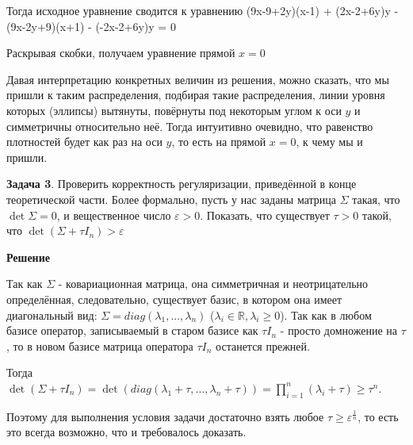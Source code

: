 Тогда исходное уравнение сводится к уравнению \left(9x-9+2y\right)\left(x-1\right) + \left(2x-2+6y\right)y - \left(9x-2y+9\right)\left(x+1\right) - \left(-2x-2+6y\right)y = 0

Раскрывая скобки, получаем уравнение прямой $x = 0$

Давая интерпретацию конкретных величин из решения, можно сказать, что мы пришли к таким распределения, подбирая такие распределения, линии уровня которых (эллипсы) вытянуты, повёрнуты под некоторым углом к оси $y$ и симметричны относительно неё. Тогда интуитивно очевидно, что равенство плотностей будет как раз на оси $y$,  то есть на прямой $x = 0$, к чему мы и пришли.



\textbf{Задача 3}. Проверить корректность регуляризации, приведённой в конце теоретической части. Более формально, пусть у нас заданы матрица $\Sigma$ такая, что $\det \Sigma = 0$, и вещественное число $\varepsilon > 0$. Показать, что существует $\tau > 0$ такой, что $\det(\Sigma + \tau I_{n}) > \varepsilon$

\textbf{Решение}

 Так как $\Sigma$ - ковариационная матрица, она симметричная и неотрицательно определённая, следовательно, существует базис, в котором она имеет диагональный вид: $\Sigma = diag (\lambda_1, ..., \lambda_n)$ ($\lambda_i \in \mathbb{R}, \lambda_i \geq 0$). Так как в любом базисе оператор, записываемый в старом базисе как $\tau I_n$ - просто домножение на $\tau$, то в новом базисе матрица оператора $\tau I_n$ останется прежней.

 Тогда $\det (\Sigma + \tau I_{n}) = \det(diag(\lambda_1 + \tau, ..., \lambda_n + \tau)) = \prod_{i = 1}^{n}(\lambda_i + \tau) \geq \tau^n$.

 Поэтому для выполнения условия задачи достаточно взять любое $\tau \geq \varepsilon^{\frac{1}{n}}$, то есть это всегда возможно, что и требовалось доказать.
